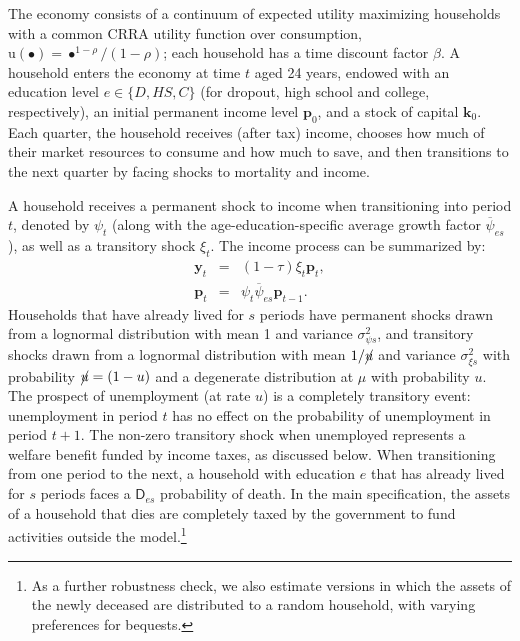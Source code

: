 \documentclass[11pt,a4paper,pdftex]{article}\usepackage[pdftex]{graphicx}\usepackage{epstopdf} \usepackage[pdftex]{hyperref}
\newcommand{\CRRA}{\ensuremath{\rho}}
\newcommand{\Discount}{\ensuremath{\beta}}
\newcommand{\erate}{\ensuremath{\cancel{\urate}}}
\newcommand{\kLev}{\ensuremath{\pmb{k}}}
\newcommand{\PDies}{\ensuremath{\mathsf{D}}}
\newcommand{\pLev}{\ensuremath{\pmb{p}}}
\newcommand{\pshk}{\psi} %
\newcommand{\tshk}{\xi} %
\newcommand{\urate}{\ensuremath{u}}
\newcommand{\util}{{\ensuremath{\mathrm{u}}}}
\newcommand{\yLev}{\ensuremath{\pmb{y}}}
\begin{document}
The economy consists of a continuum of expected utility maximizing households with a common CRRA utility function over consumption, $\util(\bullet) = \bullet^{1-\CRRA}/(1-\CRRA)$; each household has a time discount factor $\Discount$.  A household enters the economy at time $t$ aged 24 years, endowed with an education level $e \in \{D,HS,C\}$ (for dropout, high school and college, respectively), an initial permanent income level $\pLev_0$, and a stock of capital $\kLev_0$.  Each quarter, the household receives (after tax) income, chooses how much of their market resources to consume and how much to save, and then transitions to the next quarter by facing shocks to mortality and income.

A household receives a permanent shock to income when transitioning into period $t$, denoted by $\pshk_t$ (along with the age-education-specific average growth factor $\overline{\pshk}_{es}$), as well as a transitory shock $\tshk_t$.  The income process can be summarized by:
\begin{eqnarray*}
\yLev_t &=& (1 - \tau) \tshk_t \pLev_t,\\
\pLev_t &=& \pshk_t \overline{\pshk}_{es} \pLev_{t-1}.
\end{eqnarray*}
Households that have already lived for $s$ periods have permanent shocks drawn from a lognormal distribution with mean 1 and variance $\sigma^2_{\pshk s}$, and transitory shocks drawn from a lognormal distribution with mean $1/\erate$ and variance $\sigma^2_{\tshk s}$ with probability $\erate = (1 - \urate)$ and a degenerate distribution at $\mu$ with probability $\urate$.  The prospect of unemployment (at rate $\urate$) is a completely transitory event: unemployment in period $t$ has no effect on the probability of unemployment in period $t + 1$.  The non-zero transitory shock when unemployed represents a welfare benefit funded by income taxes, as discussed below.  When transitioning from one period to the next, a household with education $e$ that has already lived for $s$ periods faces a $\PDies_{es}$ probability of death.  In the main specification, the assets of a household that dies are completely taxed by the government to fund activities outside the model.\footnote{As a further robustness check, we also estimate versions in which the assets of the newly deceased are distributed to a random household, with varying preferences for bequests.}
\end{document}

